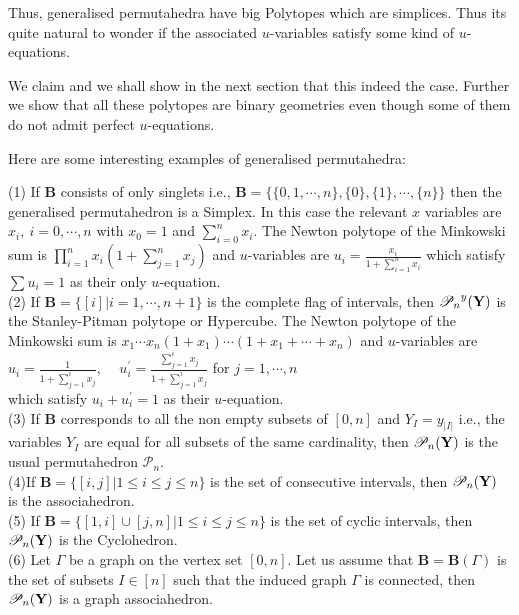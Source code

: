 \documentclass[hidelinks,12pt]{article}
\begin{document}
Thus, generalised permutahedra have big Polytopes which are simplices. Thus its quite natural to wonder if the associated $u$-variables satisfy some kind of $u$-equations. 

We claim and we shall show in the next section that this indeed the case. Further we show that all these polytopes are binary geometries even though some of them do not admit perfect $u$-equations. 

Here are some interesting examples of generalised permutahedra:

(1) If ${\mathbf B}$ consists of only singlets i.e., ${\mathbf B}=\{ \{ 0,1,\cdots,n \}, \{ 0 \},\{ 1 \},\cdots ,\{ n \} \}$ then the generalised permutahedron is a Simplex. In this case the relevant $x$ variables are $x_i,~ i=0,\cdots,n$ with $x_0=1$ and $\sum_{i=0}^n x_i$. 
The Newton polytope of the Minkowski sum is $\prod_{i=1}^{n} x_i (1+\sum_{j=1}^{n} x_j)$ and $u$-variables are 
$u_i =\frac{ x_i}{1+\sum_{i=1}^n x_i} $
which satisfy $\sum u_i =1$ as their only $u$-equation. \\

(2) If ${\mathbf B}= \{[i] | i=1,\cdots,n+1 \}$ is the complete flag of intervals, then ${\mathscr P_n}^y({\bf Y})$ is the Stanley-Pitman polytope or Hypercube.
The Newton polytope of the Minkowski sum is $x_1\cdots x_n (1+x_1) \cdots (1+x_1+\cdots +x_n)$ and $u$-variables are 
$u_i =\frac{ 1}{1+\sum_{j=1}^{i} x_j} $, ~~$u^{'}_i =\frac{ \sum_{j=1}^{i} x_j}{1+\sum_{j=1}^{i} x_j} $ for $j=1,\cdots,n$ \\
which satisfy $u_i +u^{'}_{i} =1$ as their $u$-equation. \\

(3) If ${\mathbf B}$ corresponds to all the non empty subsets of $[0,n]$ and $Y_I =y_{|I|}$ i.e., the variables $Y_I$ are equal for all subsets of the same cardinality, then ${\mathscr P_n}({\bf Y})$ is the usual permutahedron ${\mathscr P_n}$. \\

(4)If ${\mathbf B}=\{ [i,j] | 1\leq  i \leq j \leq n\}$ is the set of consecutive intervals, then ${\mathscr P_n}({\bf Y})$ is the associahedron. \\

(5) If ${\mathbf B}=\{ [1,i] \cup [j,n] | 1\leq  i \leq j \leq n\}$ is the set of cyclic intervals, then ${\mathscr P_n}({\bf Y})$ is the Cyclohedron.\\

(6) Let $\Gamma$ be a graph on the vertex set $[0,n]$. Let us assume that ${\mathbf B} = {\mathbf B}(\Gamma)$ is the set of subsets $I \in [n]$ such that the induced graph $\Gamma$ is connected, then  ${\mathscr P_n}({\bf Y})$ is a graph associahedron.
\end{document}
